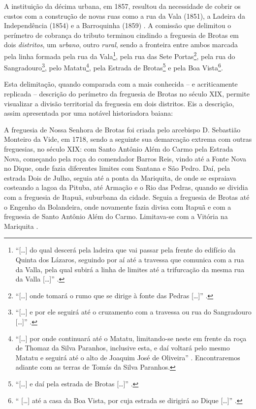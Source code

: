 A instituição da décima urbana, em 1857, resultou da necessidade de cobrir os custos com a construção de novas ruas como a rua da Vala (1851), a Ladeira da Independência (1854) e a Barroquinha (1859) \cite[p.~309]{ruy_camara_1953}. A comissão que delimitou o perímetro de cobrança do tributo terminou cindindo a freguesia de Brotas em dois \textit{distritos}, um \textit{urbano}, outro \textit{rural}, sendo a fronteira entre ambos marcada pela linha formada pela rua da Vala\footnote{``[\dots] do qual descerá pela ladeira que vai passar pela frente do edifício da Quinta dos Lázaros, seguindo por aí até a travessa que comunica com a rua da Valla, pela qual subirá a linha de limites até a trifurcação da mesma rua da Valla [\dots]'' \cite[pp.~309-310]{ruy_camara_1953}.}, pela rua das Sete Portas\footnote{``[\dots] onde tomará o rumo que se dirige à fonte das Pedras [\dots]'' \cite[pp.~309-310]{ruy_camara_1953}.}, pela rua do Sangradouro\footnote{``[\dots] e por ele seguirá até o cruzamento com a travessa ou rua do Sangradouro [\dots]'' \cite[p.~310]{ruy_camara_1953}.}, pelo Matatu\footnote{``[\dots] por onde continuará até o Matatu, limitando-se neste em frente da roça de Thomaz da Silva Paranhos, inclusive esta, e daí voltará pelo mesmo Matatu e seguirá até o alto de Joaquim José de Oliveira'' \cite[p.~310]{ruy_camara_1953}. Encontraremos adiante com as terras de Tomás da Silva Paranhos.}, pela Estrada de Brotas\footnote{``[\dots] e daí pela estrada de Brotas [\dots]'' \cite[p.~310]{ruy_camara_1953}.} e pela Boa Vista\footnote{`` [\dots] até a casa da Boa Vista, por cuja estrada se dirigirá ao Dique [\dots]'' \cite[p.~310]{ruy_camara_1953}.}. 

Esta delimitação, quando comparada com a mais conhecida -- e acriticamente replicada -- descrição do perímetro da freguesia de Brotas no século XIX, permite visualizar a divisão territorial da freguesia em dois distritos. Eis a descrição, assim apresentada por uma notável historiadora baiana:

\begin{citacao}
A freguesia de Nossa Senhora de Brotas foi criada pelo arcebispo D. Sebastião Monteiro da Vide, em 1718, sendo a seguinte sua demarcação extrema com outras freguesias, no século XIX: com Santo Antônio Além do Carmo pela Estrada Nova, começando pela roça do comendador Barros Reis, vindo até a Fonte Nova no Dique, onde fazia diferentes limites com Santana e São Pedro. Daí, pela estrada Dois de Julho, seguia até a ponta da Mariquita, de onde se espraiava costeando a lagoa da Pituba, até Armação e o Rio das Pedras, quando se dividia com a freguesia de Itapuã, suburbana da cidade. Seguia a freguesia de Brotas até o Engenho da Bolandeira, onde novamente fazia divisa com Itapuã e com a freguesia de Santo Antônio Além do Carmo. Limitava-se com a Vitória na Mariquita \cite[p.~58]{NASCIMENTO2007}.
\end{citacao}

